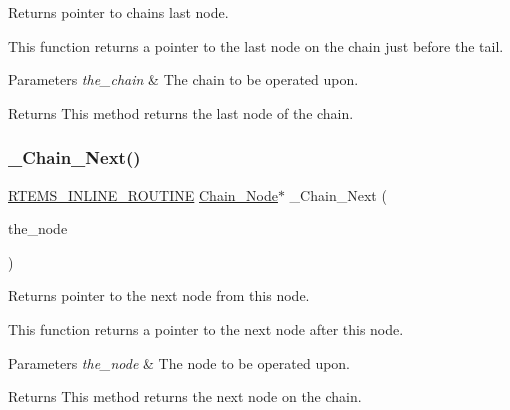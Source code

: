 Returns pointer to chain\textquotesingle{}s last node. 

This function returns a pointer to the last node on the chain just before the tail.


\begin{DoxyParams}{Parameters}
{\em the\+\_\+chain} & The chain to be operated upon.\\
\hline
\end{DoxyParams}
\begin{DoxyReturn}{Returns}
This method returns the last node of the chain. 
\end{DoxyReturn}
\mbox{\label{group__RTEMSScoreChain_ga9502cc5cb6c81ef2bce33698005e1752}} 
\subsubsection{\texorpdfstring{\_Chain\_Next()}{\_Chain\_Next()}}
{\footnotesize\ttfamily \mbox{\hyperlink{group__RTEMSScoreBaseDefs_gac216239df231d5dbd15e3520b0b9313f}{R\+T\+E\+M\+S\+\_\+\+I\+N\+L\+I\+N\+E\+\_\+\+R\+O\+U\+T\+I\+NE}} \mbox{\hyperlink{group__RTEMSScoreChain_ga0dd4bfcca1ac7f90de2842e447846d3d}{Chain\+\_\+\+Node}}$\ast$ \+\_\+\+Chain\+\_\+\+Next (\begin{DoxyParamCaption}\item[{const \mbox{\hyperlink{group__RTEMSScoreChain_ga0dd4bfcca1ac7f90de2842e447846d3d}{Chain\+\_\+\+Node}} $\ast$}]{the\+\_\+node }\end{DoxyParamCaption})}



Returns pointer to the next node from this node. 

This function returns a pointer to the next node after this node.


\begin{DoxyParams}{Parameters}
{\em the\+\_\+node} & The node to be operated upon.\\
\hline
\end{DoxyParams}
\begin{DoxyReturn}{Returns}
This method returns the next node on the chain. 
\end{DoxyReturn}
\mbox{\label{group__RTEMSScoreChain_ga4daa9900dfef1496e71d41a5377ed645}} 
